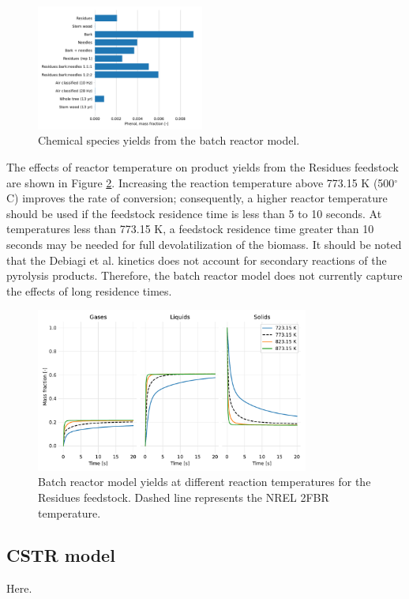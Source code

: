 \begin{figure}[H]
    \includegraphics[width=0.49\textwidth]{figures/batch-phenol.pdf}
    \caption{Chemical species yields from the batch reactor model.}
    \label{fig:batch-chemicals}
\end{figure}

The effects of reactor temperature on product yields from the Residues feedstock are shown in Figure \ref{fig:batch-temps}. Increasing the reaction temperature above 773.15 K (500$^\circ$C) improves the rate of conversion; consequently, a higher reactor temperature should be used if the feedstock residence time is less than 5 to 10 seconds. At temperatures less than 773.15 K, a feedstock residence time greater than 10 seconds may be needed for full devolatilization of the biomass. It should be noted that the Debiagi et al. kinetics does not account for secondary reactions of the pyrolysis products. Therefore, the batch reactor model does not currently capture the effects of long residence times.

\begin{figure}[H]
    \centering
    \includegraphics[width=0.8\textwidth]{figures/batch-temps.pdf}
    \caption{Batch reactor model yields at different reaction temperatures for the Residues feedstock. Dashed line represents the NREL 2FBR temperature.}
    \label{fig:batch-temps}
\end{figure}

\subsection{CSTR model}

Here.
